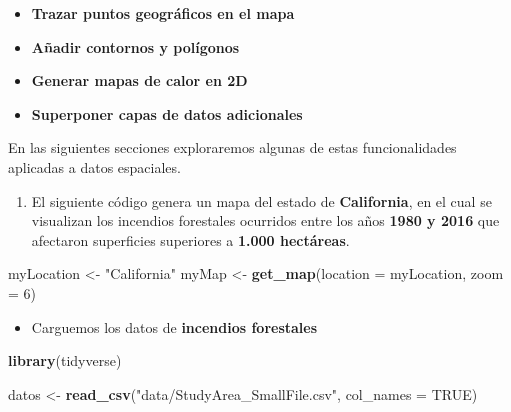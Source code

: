 \documentclass[
]{book}
\newenvironment{Shaded}{\begin{snugshade}}{\end{snugshade}}
\newcommand{\AttributeTok}[1]{\textcolor[rgb]{0.13,0.29,0.53}{#1}}
\newcommand{\ConstantTok}[1]{\textcolor[rgb]{0.56,0.35,0.01}{#1}}
\newcommand{\DecValTok}[1]{\textcolor[rgb]{0.00,0.00,0.81}{#1}}
\newcommand{\FunctionTok}[1]{\textcolor[rgb]{0.13,0.29,0.53}{\textbf{#1}}}
\newcommand{\NormalTok}[1]{#1}
\newcommand{\OtherTok}[1]{\textcolor[rgb]{0.56,0.35,0.01}{#1}}
\newcommand{\StringTok}[1]{\textcolor[rgb]{0.31,0.60,0.02}{#1}}
\providecommand{\tightlist}{%
  \setlength{\itemsep}{0pt}\setlength{\parskip}{0pt}}
\begin{document}
\begin{itemize}
\tightlist
\item
  \textbf{Trazar puntos geográficos en el mapa}\\
\item
  \textbf{Añadir contornos y polígonos}\\
\item
  \textbf{Generar mapas de calor en 2D}\\
\item
  \textbf{Superponer capas de datos adicionales}
\end{itemize}

En las siguientes secciones exploraremos algunas de estas funcionalidades aplicadas a datos espaciales.

\begin{enumerate}
\def\labelenumi{\arabic{enumi}.}
\tightlist
\item
  El siguiente código genera un mapa del estado de \textbf{California}, en el cual se visualizan los incendios forestales ocurridos entre los años \textbf{1980 y 2016} que afectaron superficies superiores a \textbf{1.000 hectáreas}.
\end{enumerate}

\begin{Shaded}
\begin{Highlighting}[]
\NormalTok{myLocation }\OtherTok{\textless{}{-}} \StringTok{"California"}
\NormalTok{myMap }\OtherTok{\textless{}{-}} \FunctionTok{get\_map}\NormalTok{(}\AttributeTok{location =}\NormalTok{ myLocation, }\AttributeTok{zoom =} \DecValTok{6}\NormalTok{)}
\end{Highlighting}
\end{Shaded}

\begin{itemize}
\tightlist
\item
  Carguemos los datos de \textbf{incendios forestales}
\end{itemize}

\begin{Shaded}
\begin{Highlighting}[]
\FunctionTok{library}\NormalTok{(tidyverse)}

\NormalTok{datos }\OtherTok{\textless{}{-}} \FunctionTok{read\_csv}\NormalTok{(}\StringTok{"data/StudyArea\_SmallFile.csv"}\NormalTok{, }\AttributeTok{col\_names =} \ConstantTok{TRUE}\NormalTok{)}
\end{Highlighting}
\end{Shaded}
\end{document}

